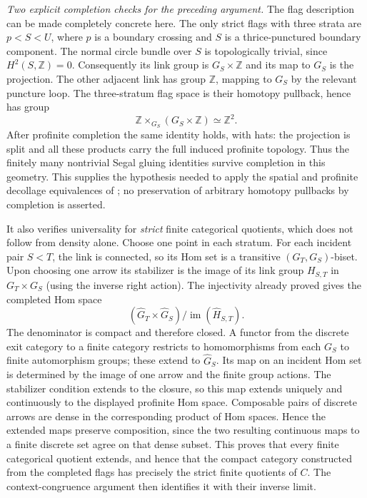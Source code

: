 \emph{Two explicit completion checks for the preceding argument.}
The flag description can be made completely concrete here. The only
strict flags with three strata are
$p<S<U$, where $p$ is a boundary crossing and $S$ is a
thrice-punctured boundary component. The normal circle bundle over
$S$ is topologically trivial, since $H^2(S,\mathbb Z)=0$.
Consequently its link group is $G_S\times\mathbb Z$ and its map to
$G_S$ is the projection. The other adjacent link has group
$\mathbb Z$, mapping to $G_S$ by the relevant puncture loop. The
three-stratum flag space is their homotopy pullback, hence has group
\[
 \mathbb Z\mathbin{\times}_{G_S}(G_S\times\mathbb Z)
                         \simeq\mathbb Z^2.
\]
After profinite completion the same identity holds, with hats: the
projection is split and all these products carry the full induced
profinite topology. Thus the finitely many nontrivial Segal gluing
identities survive completion in this geometry. This supplies the
hypothesis needed to apply the spatial and profinite decollage
equivalences of \cite[Theorem~2.7.4 and equivalence~(2.8.9)]{FA_BGH2020};
no preservation of arbitrary homotopy pullbacks by completion is
asserted.

It also verifies universality for \emph{strict} finite categorical
quotients, which does not follow from density alone. Choose one point
in each stratum. For each incident pair $S<T$, the link is connected,
so its Hom set is a transitive $(G_T,G_S)$-biset. Upon choosing one
arrow its stabilizer is the image of its link group $H_{S,T}$ in
$G_T\times G_S$ (using the inverse right action). The injectivity
already proved gives the completed Hom space
\[
  (\widehat G_T\times\widehat G_S)
           /\operatorname{im}(\widehat H_{S,T}).
\]
The denominator is compact and therefore closed. A functor from the
discrete exit category to a finite category restricts to homomorphisms
from each $G_S$ to finite automorphism groups; these extend to
$\widehat G_S$. Its map on an incident Hom set is determined by the
image of one arrow and the finite group actions. The stabilizer
condition extends to the closure, so this map extends uniquely and
continuously to the displayed profinite Hom space. Composable pairs
of discrete arrows are dense in the corresponding product of Hom
spaces. Hence the extended maps preserve composition, since the
two resulting continuous maps to a finite discrete set agree on that
dense subset. This proves that every finite categorical quotient
extends, and hence that the compact category constructed from the
completed flags has precisely the strict finite quotients of $C$.
The context-congruence argument then identifies it with their inverse
limit.

